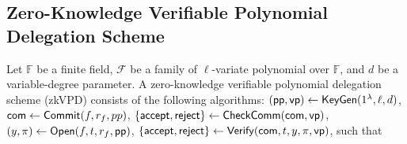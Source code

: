 
\subsection{Zero-Knowledge Verifiable Polynomial Delegation Scheme}
\label{subsec::zkvpd}

Let $\mathbb{F}$ be a finite field, $\mathcal{F}$ be a family of $\ell$-variate polynomial over $\mathbb{F}$, and $d$ be a variable-degree parameter. A zero-knowledge verifiable polynomial delegation scheme (zkVPD) consists of the following algorithms: $(\mathsf{pp}, \mathsf{vp}) \leftarrow \mathsf{KeyGen}(1^\lambda, \ell, d)$, ${{\sf com}} \leftarrow \mathsf{Commit}(f, r_f, pp)$, $\{\mathsf{accept},\mathsf{reject}\}\leftarrow\mathsf{CheckComm}({{\sf com}}, \mathsf{vp})$, $(y,\pi)\leftarrow\mathsf{Open}(f,t,r_f,\mathsf{pp})$, $\{\mathsf{accept},\mathsf{reject}\}\leftarrow\mathsf{Verify}({{\sf com}},t,y,\pi,\mathsf{vp})$, such that 

